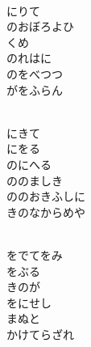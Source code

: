 \documentclass[10pt,b5j]{tarticle} %
\begin{document}
\vspace{1.5em} %
\newcommand{\linespace}{0.5em} %
\newcommand{\blocksize}{0.5\hsize} %
\newcommand{\itemmargin}{6em} %
\begin{enumerate} %
    \setlength{\itemindent}{\itemmargin} %
    \begin{minipage}[c]{\blocksize}
    
        \vspace{\linespace}
        \item~\\
        にりて\\
        のおぼろよひ\\
        くめ\\
        のれはに\\
        のをべつつ\\
        がをふらん
        
        \vspace{\linespace}
        \item~\\
        にきて\\
        にをる\\
        のにへる\\
        ののましき\\
        ののおきふしに\\
        きのなからめや
        
        \vspace{\linespace}
        \item~\\
        をでてをみ\\
        をぶる\\
        きのが\\
        をにせし\\
        まぬと\\
        かけてらざれ
        

\end{minipage}
\end{enumerate}
\end{document}
